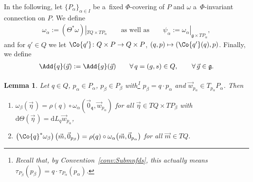 \documentclass[pdftex]{sigma}
\numberwithin{equation}{section}
\newtheorem{Lemma}[Theorem]{Lemma}
\begin{document}
In the following, let $\{P_\alpha\}_{\alpha\in I}$ be a~f\/ixed $\Phi$-covering of $P$ and $\omega$ a~$\Phi$-invariant
connection on $P$.
We def\/ine
\begin{gather*}
\omega_\alpha:=(\Theta^{*}\omega)|_{TQ\times TP_\alpha}\qquad\text{as well as}\qquad\psi_\alpha:=\omega_\alpha|_{\mathfrak{g}\times
TP_\alpha},
\end{gather*}
and for $q'\in Q$ we let $\Co{q'}\colon Q\times P\rightarrow Q\times P$, $(q,p)\mapsto \left(\Co{q'}(q),p\right)$. Finally, we define
\begin{gather*}
\Add{q}(\vec{g}):=\Add{g}(\vec{g})\qquad\forall\, q=(g,s)\in Q,\qquad \forall\, \vec{g}\in \mathfrak{g}.
\end{gather*}
\begin{Lemma}
\label{lemma:omegaalpha}
Let $q\in Q$, $p_\alpha\in P_\alpha$, $p_\beta\in P_\beta$ with\footnote{Recall that, by Convention~\ref{conv:Submnfds}, this actually means $\tau_{P_\beta}(p_\beta)=q\cdot
\tau_{P_\alpha}(p_\alpha)$.} $p_\beta=q\cdot p_\alpha$ and $\vec{w}_{p_\alpha}\in
T_{p_\alpha}P_\alpha$.
Then
\begin{enumerate}\itemsep=0pt
\item[$1)$]
$\omega_\beta(\vec{\eta}\hspace{1pt})=\rho(q)\circ \omega_\alpha(\vec{0}_\mathfrak{q},\vec{w}_{p_\alpha})$ for all $\vec{\eta}\in
TQ\times TP_\beta$ with $\mathrm{d}\Theta(\vec{\eta}\hspace{1pt})=\mathrm{d} L_q\vec{w}_{p_\alpha}$,
\item[$2)$]
$\left(\Co{q}^{*}\omega_\beta\right)\big(\vec{m},\vec{0}_{p_\beta}\big)=\rho(q)\circ
\omega_\alpha\big(\vec{m},\vec{0}_{p_\alpha}\big)$ for all $\vec{m}\in TQ$.
\end{enumerate}
\end{Lemma}
\end{document}
